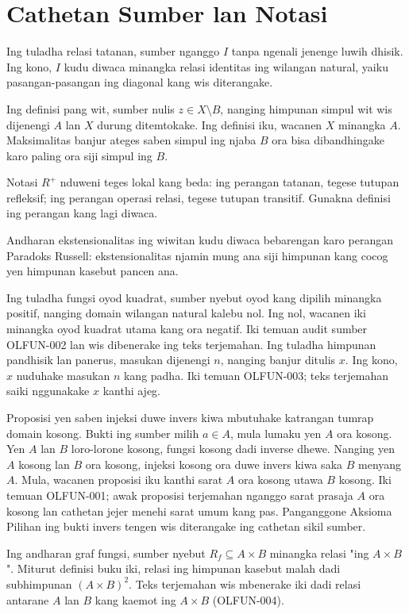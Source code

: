 \chapter*{Cathetan Sumber lan Notasi}

Ing tuladha relasi tatanan, sumber nganggo $I$ tanpa
ngenali jenenge luwih dhisik. Ing kono, $I$ kudu diwaca
minangka relasi identitas ing wilangan natural,
yaiku pasangan-pasangan ing diagonal kang wis diterangake.

Ing definisi pang wit, sumber nulis $z \in X \setminus B$,
nanging himpunan simpul wit wis dijenengi $A$ lan $X$
durung ditemtokake. Ing definisi iku, wacanen $X$ minangka $A$.
Maksimalitas banjur ateges saben simpul ing njaba $B$
ora bisa dibandhingake karo paling ora siji simpul ing $B$.

Notasi $R^+$ nduweni teges lokal kang beda:
ing perangan tatanan, tegese tutupan refleksif;
ing perangan operasi relasi, tegese tutupan transitif.
Gunakna definisi ing perangan kang lagi diwaca.

Andharan ekstensionalitas ing wiwitan kudu diwaca
bebarengan karo perangan Paradoks Russell:
ekstensionalitas njamin mung ana siji himpunan
kang cocog yen himpunan kasebut pancen ana.

Ing tuladha fungsi oyod kuadrat, sumber nyebut oyod kang dipilih
minangka positif, nanging domain wilangan natural kalebu nol.
Ing nol, wacanen iki minangka oyod kuadrat utama kang ora negatif.
Iki temuan audit sumber OLFUN-002 lan wis dibenerake ing teks terjemahan.
Ing tuladha himpunan pandhisik lan panerus, masukan dijenengi $n$,
nanging banjur ditulis $x$. Ing kono, $x$ nuduhake masukan $n$ kang padha.
Iki temuan OLFUN-003; teks terjemahan saiki nggunakake $x$ kanthi ajeg.

Proposisi yen saben injeksi duwe invers kiwa mbutuhake katrangan
tumrap domain kosong. Bukti ing sumber milih $a \in A$, mula
lumaku yen $A$ ora kosong. Yen $A$ lan $B$ loro-lorone kosong,
fungsi kosong dadi inverse dhewe. Nanging yen $A$ kosong lan $B$
ora kosong, injeksi kosong ora duwe invers kiwa saka $B$ menyang $A$.
Mula, wacanen proposisi iku kanthi sarat $A$ ora kosong utawa $B$ kosong.
Iki temuan OLFUN-001; awak proposisi terjemahan nganggo sarat prasaja
$A$ ora kosong lan cathetan jejer menehi sarat umum kang pas.
Panganggone Aksioma Pilihan ing bukti invers tengen wis diterangake
ing cathetan sikil sumber.

Ing andharan graf fungsi, sumber nyebut $R_f\subseteq A\times B$
minangka relasi "ing $A\times B$". Miturut definisi buku iki,
relasi ing himpunan kasebut malah dadi subhimpunan
$(A\times B)^2$. Teks terjemahan wis mbenerake iki dadi relasi
antarane $A$ lan $B$ kang kaemot ing $A\times B$ (OLFUN-004).

